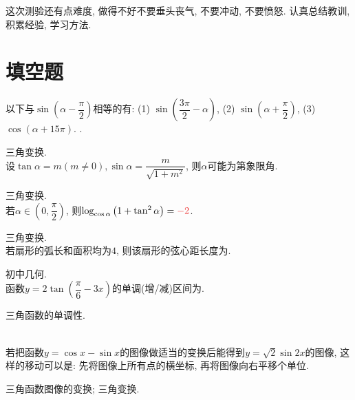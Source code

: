 \documentclass[8pt]{article}
\author{\Author}
\title{\Title}
\date{}
\begin{document}
	\maketitle

	 这次测验还有点难度, 做得不好不要垂头丧气, 不要冲动, 不要愤怒. 认真总结教训, 积累经验, 学习方法.

	\section{填空题}
		以下与\(\sin \left(\alpha - \dfrac{\pi}{2}\right)\)相等的有: (1) \(\sin \left(\dfrac{3\pi}{2} - \alpha \right)\), (2) \(\sin \left(\alpha + \dfrac{\pi}{2}\right)\), (3) \(\cos \left(\alpha + 15\pi\right)\). .

		三角变换.
		~\\

		设\(\tan \alpha = m (m \neq 0), \sin \alpha = \dfrac{m}{\sqrt{1+m^2}}\), 则\(\alpha\)可能为第象限角.

		三角变换.
		~\\

		若\(\alpha \in \left(0, \dfrac{\pi}{2}\right)\), 则\(\log_{\cos \alpha} \left(1+\tan^2\alpha\right)=\ansmath{-2}\).

		三角变换.
		~\\

		若扇形的弧长和面积均为\(4\), 则该扇形的弦心距长度为.

		初中几何.
		~\\

		函数\(y=2\tan \left(\dfrac{\pi}{6} - 3x\right)\)的单调(增/减)区间为.

		三角函数的单调性.

		~\\

		若把函数\(y=\cos x-\sin x\)的图像做适当的变换后能得到\(y=\sqrt{2} \sin 2x\)的图像, 这样的移动可以是: 先将图像上所有点的横坐标, 再将图像向右平移个单位.

		三角函数图像的变换; 三角变换.

\end{document}
